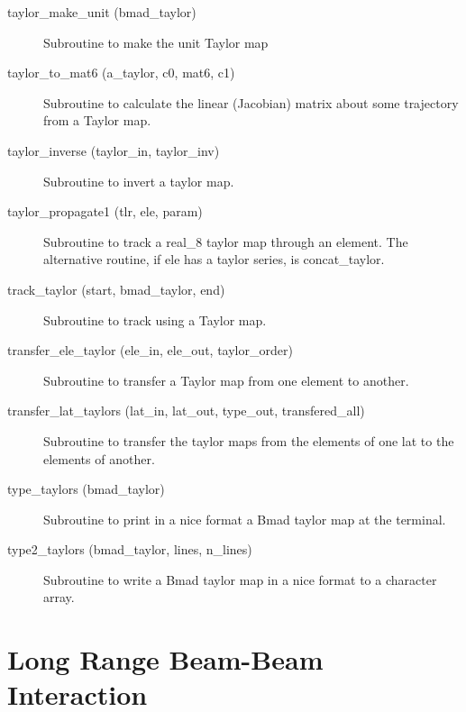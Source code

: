\begin{description}
\item[taylor_make_unit (bmad_taylor)] \Newline
Subroutine to make the unit Taylor map

\item[taylor_to_mat6 (a_taylor, c0, mat6, c1)] \Newline
Subroutine to calculate the linear (Jacobian) matrix about some
trajectory from a Taylor map.

\item[taylor_inverse (taylor_in, taylor_inv)] \Newline
Subroutine to invert a taylor map. 

\item[taylor_propagate1 (tlr, ele, param)] \Newline
Subroutine to track a real_8 taylor map through an element. 
The alternative routine, if ele has a taylor series, is concat_taylor. 

\item[track_taylor (start, bmad_taylor, end)] \Newline
Subroutine to track using a Taylor map. 

\item[transfer_ele_taylor (ele_in, ele_out, taylor_order)] \Newline 
Subroutine to transfer a Taylor map from one element to another.

\item[transfer_lat_taylors (lat_in, lat_out, 
                                             type_out, transfered_all) ] \Newline 
Subroutine to transfer the taylor maps from the elements of one lat to
the elements of another. 

\item[type_taylors (bmad_taylor)] \Newline
Subroutine to print in a nice format a Bmad taylor map at the terminal. 

\item[type2_taylors (bmad_taylor, lines, n_lines)] \Newline
Subroutine to write a Bmad taylor map in a nice format to a character array. 

\end{description}

\section{Long Range Beam-Beam Interaction}
\label{r:lrbbi}    


